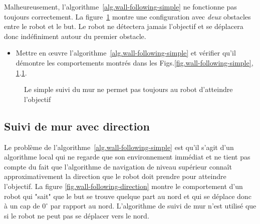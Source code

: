 Malheureusement, l'algorithme~\ref{alg.wall-following-simple} ne fonctionne pas toujours correctement. La figure~\ref{fig.wall-following-simple-bug} montre une configuration avec \emph{deux} obstacles entre le robot et le but. Le robot ne détectera jamais l'objectif et se déplacera donc indéfiniment autour du premier obstacle.

\begin{framed}
\begin{itemize}
\item Mettre en œuvre l'algorithme~\ref{alg.wall-following-simple} et vérifier qu'il démontre les comportements montrés dans les Figs.\ref{fig.wall-following-simple}, \ref{fig.wall-following-simple-bug}.\ref{fig.wall-following-simple-bug}.
\end{itemize}
\end{framed}

\begin{figure}
\begin{center}
\caption{Le simple suivi du mur ne permet pas toujours au robot d'atteindre l'objectif}\label{fig.wall-following-simple-bug}
\end{center}
\end{figure}

\subsection{Suivi de mur avec direction}

Le problème de l'algorithme~\ref{alg.wall-following-simple} est qu'il s'agit d'un algorithme local qui ne regarde que son environnement immédiat et ne tient pas compte du fait que l'algorithme de navigation de niveau supérieur connaît approximativement la direction que le robot doit prendre pour atteindre l'objectif. La figure \ref{fig.wall-following-direction} montre le comportement d'un robot qui "sait" que le but se trouve quelque part au nord et qui se déplace donc à un cap de $0^\circ$ par rapport au nord. L'algorithme de suivi de mur n'est utilisé que si le robot ne peut pas se déplacer vers le nord.

